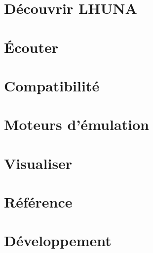 \documentclass[11pt,a4paper,twoside,openright]{book}
\begin{document}
\frontmatter


\tableofcontents


\mainmatter
\part{Découvrir LHUNA}




\part{Écouter}




\part{Compatibilité}\label{part:compat}





\part{Moteurs d'émulation}



\part{Visualiser}





\part{Référence}





\part{Développement}




\appendix




\end{document}
